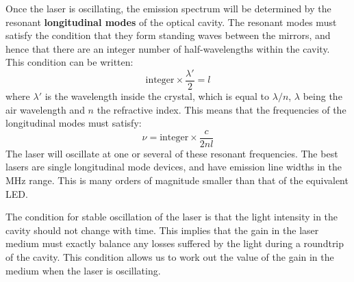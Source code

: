 \documentclass[12pt]{book}
\begin{document}
{Once the laser is oscillating, the emission spectrum will be determined by the resonant \textbf{longitudinal modes} of the optical cavity. The resonant modes must satisfy the condition that they form standing waves between the mirrors, and hence that there are an integer number of half-wavelengths within the cavity. This condition can be written:
\begin{equation}\label{equa:5.14}
  \text{integer}\times{\frac{\lambda'}{2}}=l
\end{equation}
where $\lambda'$ is the wavelength inside the crystal, which is equal to $\lambda/n$, $\lambda$ being the air wavelength and $n$ the refractive index. This means that the frequencies of the longitudinal modes must satisfy:
\begin{equation}\label{equa:5.15}
  \nu=\text{integer}\times{\frac{c}{2nl}}
\end{equation}
The laser will oscillate at one or several of these resonant frequencies. The best lasers are single longitudinal mode devices, and have emission line widths in the MHz range. This is many orders of magnitude smaller than that of the equivalent LED.

The condition for stable oscillation of the laser is that the light intensity in the cavity should not change with time. This implies that the gain in the laser medium must exactly balance any losses suffered by the light during a roundtrip of the cavity. This condition allows us to work out the value of the gain in the medium when the laser is oscillating.

}
\end{document}
